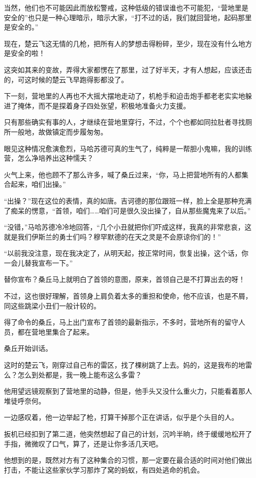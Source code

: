 当然，他们也不可能因此而放松警戒，这种低级的错误谁也不可能犯，“营地里是安全的”也只是一种心理暗示，暗示大家，“打不过的话，我们就回营地，起码那里是安全的。”

现在，楚云飞这无情的几枪，把所有人的梦想击得粉碎，至少，现在没有什么地方是安全的啦！

这突如其来的变故，弄得大家都愣在了那里，过了好半天，才有人想起，应该还击的，可这时候的楚云飞早跑得影都没了。

下一刻，营地里的人再也不大摇大摆地走动了，机枪手和迫击炮手都老老实实地躲进了掩体，而不是探着身子四处张望，积极地准备火力支援。

只有那些确实有事的人，才继续在营地里穿行，不过，个个也都如同拉肚者寻找厕所一般地，故做镇定而步履匆匆。

眼见这种情况愈演愈烈，马哈苏德可真的生气了，纯粹是一帮胆小鬼嘛，我的训练营，怎么净培养出这种懦夫？

火气上来，他也顾不了那么许多，喊了桑丘过来，“你，马上把营地所有的人都集合起来，咱们出操。”

“出操？”现在这位的表情，真的如唐。吉诃德的那位跟班一样，脸上全是那种充满了痴呆的愣意，“首领，咱们……咱们可是很久没出操了，自从那些魔鬼来了以后。”

“没错，”马哈苏德冷冷地回答，“几个小丑就把你们吓成这样，我真的非常悲哀，这就是我们伊斯兰的勇士们吗？穆罕默德的在天之灵是不会原谅你们的！”

“以前我没注意，现在我决定了，从明天起，按正常时间，恢复出操，这个话，你一会儿替我宣布一下。”

替你宣布？桑丘马上就明白了首领的意图，原来，首领自己是不打算出去的呀！

不过，这也很好理解，首领身上肩负着太多的重担和使命，他不应该，也是不屑，同这些跳梁小丑们一般计较的。

得了命令的桑丘，马上出门宣布了首领的最新指示，不多时，营地所有的留守人员，都在营地里集合了起来。

桑丘开始训话。

这时的楚云飞，刚穿过自己布的雷区，找了棵树跳了上去。妈的，这是我布的地雷么？怎么到处都是，我一晚上能布这么多雷？

他用望远镜观察到了营地里的动静，但是，他手头又没什么重火力，只能看着那人堆徒呼奈何。

一边感叹着，他一边举起了枪，打算干掉那个正在讲话，似乎是个头目的人。

扳机已经扣到了第二道，他突然想起了自己的计划，沉吟半晌，终于缓缓地松开了手指，微微叹了口气，算了，还是让你多活几天吧。

他想到的是，既然对方有了这种集合的习惯，那一定要在最合适的时间对他们做出打击，不能让这些家伙学习那炸了窝的蚂蚁，有四处逃命的机会。

